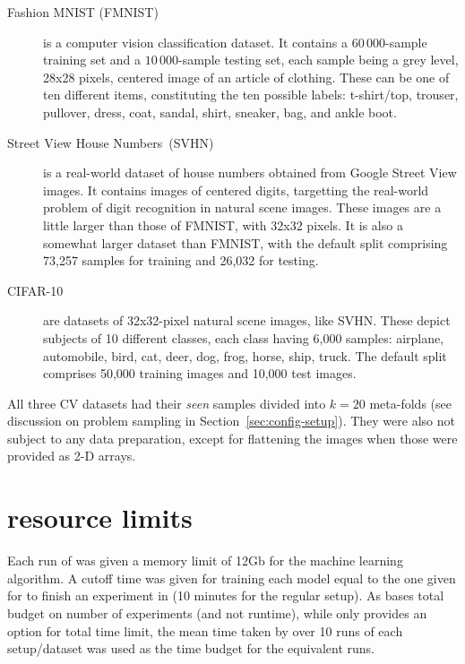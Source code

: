 \begin{description}
\item[Fashion MNIST (FMNIST)]\cite{fashion}
is a computer vision classification dataset. It contains  a $60\,000$-sample training set and a $10\,000$-sample testing set, each sample being a grey level, 28x28 pixels, centered image of an article of clothing. These can be one of ten different items, constituting the ten possible labels: t-shirt/top, trouser, pullover, dress, coat, sandal, shirt, sneaker, bag, and ankle boot.

\item[Street View House Numbers~(SVHN)]\cite{svhn}
is a real-world dataset of house numbers obtained from Google Street View images. It contains images of centered digits, targetting the real-world problem of digit recognition in natural scene images. These images are a little larger than those of FMNIST, with 32x32 pixels. It is also a somewhat larger dataset than FMNIST, with the default split comprising 73,257 samples for training and 26,032 for testing.

\item[CIFAR-10]\cite{cifar}
are datasets of 32x32-pixel natural scene images, like SVHN. These depict subjects of 10 different classes, each class having 6,000 samples: airplane, automobile, bird, cat, deer, dog, frog, horse, ship, truck. The default split comprises 50,000 training images and 10,000 test images.
\end{description}

All three CV datasets had their \textit{seen} samples divided into $k=20$ meta-folds (see discussion on problem sampling in Section~\ref{sec:config-setup}). They were also not subject to any data preparation, except for flattening the images when those were provided as 2-D arrays.


\section{\autosklearn resource limits}
Each run of \autosklearn was given a memory limit of 12Gb for the machine learning algorithm. A cutoff time was given for training each model equal to the one given for \irace to finish an experiment in \isklearn (10 minutes for the regular setup). As \isklearn bases total budget on number of experiments (and not runtime), while \autosklearn only provides an option for total time limit, the mean time taken by \isklearn over 10 runs of each setup/dataset was used as the time budget for the equivalent \autosklearn runs.